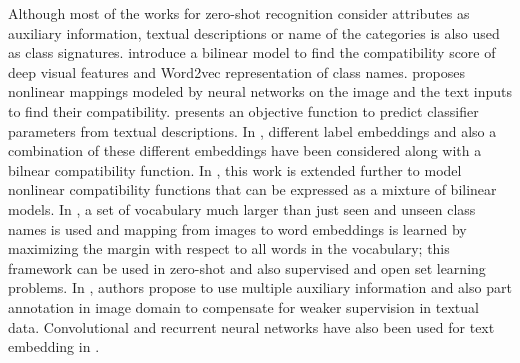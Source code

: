 \documentclass[letterpaper]{article}
\begin{document}
 Although most of the works for zero-shot recognition consider attributes as auxiliary information,
textual descriptions or name of the categories is also used as class signatures.
 \cite{devise} introduce a bilinear model to find the compatibility score of deep visual features and Word2vec \cite{word2vec} representation of class names.
\cite{ba2015} proposes nonlinear mappings modeled by neural networks on the image and the text inputs to find their compatibility.
\cite{mohamed13} presents an objective function to predict classifier parameters from textual descriptions.
 In \cite{Akata2015}, different label embeddings and also a combination of these different embeddings have been considered along with a bilnear
 compatibility function.
  In \cite{Xian2016}, this work is extended further to model nonlinear compatibility
 functions that can be expressed as a mixture of bilinear models.
In \cite{Fu2016}, a set of vocabulary much larger than just seen and unseen class names is used and mapping from images to word embeddings is learned
by  maximizing the margin with respect to all words in the vocabulary;
 this framework can be used in zero-shot and also supervised and open set learning problems.
In  \cite{Akata2016}, authors propose to use multiple auxiliary information and also
 part annotation in image domain to compensate for weaker supervision in textual data.
Convolutional and recurrent neural networks have also been used for text embedding in \cite{Akata2016rnn}.
\end{document}
